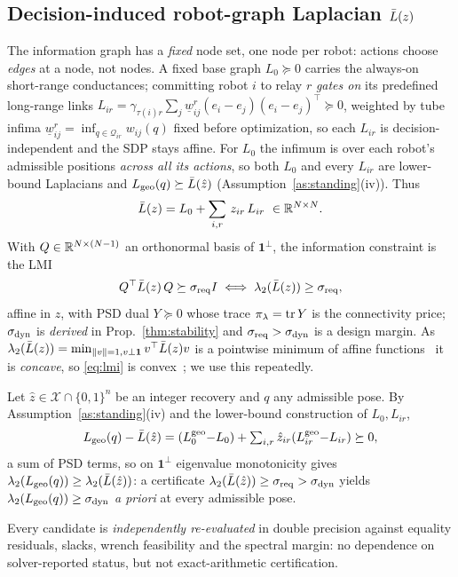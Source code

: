 \subsection{Decision-induced robot-graph Laplacian $\bar L(z)$}
The information graph has a \emph{fixed} node set, one node per robot: actions choose
\emph{edges} at a node, not nodes. A fixed base graph $L_0\succeq0$ carries the always-on
short-range conductances; committing robot $i$ to relay $r$ \emph{gates on} its predefined
long-range links
$L_{ir}=\gamma_{\tau(i)r}\sum_{j}\underline w^{r}_{ij}(e_i{-}e_j)(e_i{-}e_j)^{\top}\succeq0$,
weighted by tube infima $\underline w^{r}_{ij}=\inf_{q\in\mathcal Q_{ir}}w_{ij}(q)$ fixed before
optimization, so each $L_{ir}$ is decision-independent and the SDP stays affine. For $L_0$ the
infimum is over each robot's admissible positions \emph{across all its actions}, so both $L_0$
and every $L_{ir}$ are lower-bound Laplacians and $L_{\mathrm{geo}}(q)\succeq\bar L(\hat z)$
(Assumption~\ref{as:standing}(iv)). Thus
\begin{equation}
\Lap(z)=L_0+\sum_{i,r}\,z_{ir}\,L_{ir}\ \in\R^{N\times N}.
\label{eq:laplacian}
\end{equation}
With $Q\in\mathbb{R}^{N\times(N-1)}$ an orthonormal basis of $\mathbf 1^{\perp}$, the information
constraint is the LMI
\begin{equation}
Q^{\top}\bar L(z)\,Q\succeq\sigma_{\mathrm{req}} I
\;\Longleftrightarrow\;
\lambda_2(\bar L(z))\ge\sigma_{\mathrm{req}},
\label{eq:lmi}
\end{equation}
affine in $z$, with PSD dual $Y\succeq0$ whose trace $\pi_\lambda=\operatorname{tr}Y$ is the
connectivity price; $\sigma_{\mathrm{dyn}}$ is \emph{derived} in
Prop.~\ref{thm:stability} and $\sigma_{\mathrm{req}}>\sigma_{\mathrm{dyn}}$ is a design margin. As
$\lambda_2(\bar L(z))=\min_{\|v\|=1,v\perp\mathbf1}v^{\top}\bar L(z)v$ is a pointwise minimum of
affine functions~\cite{fiedler1973} it is \emph{concave}, so \eqref{eq:lmi} is
convex~\cite{ghosh2006growing}; we use this repeatedly.

\begin{lemma}\label{lem:bridge}
Let $\hat z\in\mathcal X\cap\{0,1\}^{n}$ be an integer recovery and $q$ any admissible pose. By
Assumption~\ref{as:standing}(iv) and the lower-bound construction of $L_0,L_{ir}$,
\begin{equation}
L_{\mathrm{geo}}(q)-\bar L(\hat z)=(L_0^{\mathrm{geo}}{-}L_0)+\textstyle\sum_{i,r}\hat z_{ir}
(L_{ir}^{\mathrm{geo}}{-}L_{ir})\succeq0,
\label{eq:mismatch}
\end{equation}
a sum of PSD terms, so on $\mathbf 1^{\perp}$ eigenvalue monotonicity gives
$\lambda_2(L_{\mathrm{geo}}(q))\ge\lambda_2(\bar L(\hat z))$: a certificate
$\lambda_2(\bar L(\hat z))\ge\sigma_{\mathrm{req}}>\sigma_{\mathrm{dyn}}$ yields $\lambda_2(L_{\mathrm{geo}}(q))\ge\sigma_{\mathrm{dyn}}$
\emph{a priori} at every admissible pose.
\end{lemma}
Every candidate is \emph{independently re-evaluated} in double precision against equality
residuals, slacks, wrench feasibility and the spectral margin: no dependence on
solver-reported status, but not exact-arithmetic certification.